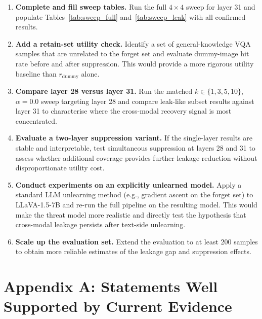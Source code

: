 \documentclass[12pt, a4paper]{article}
\begin{document}
\begin{enumerate}[label=(\arabic*), itemsep=4pt]
  \item \textbf{Complete and fill sweep tables.}
    Run the full $4 \times 4$ sweep for layer 31 and populate
    Tables~\ref{tab:sweep_full} and~\ref{tab:sweep_leak} with all confirmed results.

  \item \textbf{Add a retain-set utility check.}
    Identify a set of general-knowledge VQA samples that are unrelated to the
    forget set and evaluate dummy-image hit rate before and after suppression.
    This would provide a more rigorous utility baseline than $r_{\text{dummy}}$ alone.

  \item \textbf{Compare layer 28 versus layer 31.}
    Run the matched $k \in \{1, 3, 5, 10\}$, $\alpha = 0.0$ sweep targeting layer 28
    and compare leak-like subset results against layer 31 to characterise where the
    cross-modal recovery signal is most concentrated.

  \item \textbf{Evaluate a two-layer suppression variant.}
    If the single-layer results are stable and interpretable, test simultaneous
    suppression at layers 28 and 31 to assess whether additional coverage provides
    further leakage reduction without disproportionate utility cost.

  \item \textbf{Conduct experiments on an explicitly unlearned model.}
    Apply a standard LLM unlearning method (e.g., gradient ascent on the forget set)
    to LLaVA-1.5-7B and re-run the full pipeline on the resulting model.
    This would make the threat model more realistic and directly test the hypothesis
    that cross-modal leakage persists after text-side unlearning.

  \item \textbf{Scale up the evaluation set.}
    Extend the evaluation to at least 200 samples to obtain more reliable estimates
    of the leakage gap and suppression effects.
\end{enumerate}


\section*{Appendix A: Statements Well Supported by Current Evidence}
\label{app:evidence}
\end{document}
